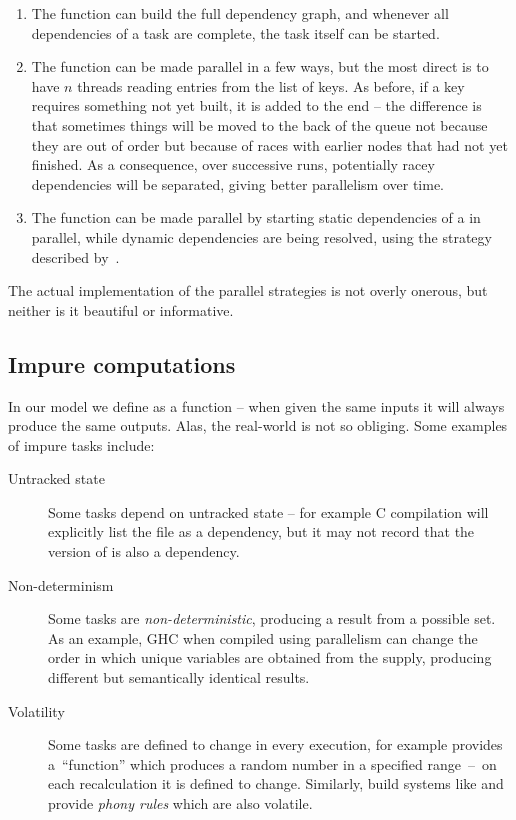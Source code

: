 \begin{enumerate}
\item The  function can build the full dependency graph, and
whenever all dependencies of a task are complete, the task itself can be started.

\item The  function can be made parallel in a few ways, but the
most direct is to have $n$ threads reading entries from the list of keys. As
before, if a key requires something not yet built, it is added to the end -- the
difference is that sometimes things will be moved to the back of the queue not
because they are out of order but because of races with earlier nodes that had
not yet finished. As a consequence, over successive runs, potentially racey
dependencies will be separated, giving better parallelism over time.

\item The  function can be made parallel by starting static
dependencies of a  in parallel, while dynamic dependencies are being
resolved, using the strategy described by~\citet{marlow2014haxl}.
\end{enumerate}

The actual implementation of the parallel strategies is not overly onerous,
but neither is it beautiful or informative.

\subsection{Impure computations}\label{sec-non-determinism}

In our model we define  as a function -- when given the same inputs it
will always produce the same outputs. Alas, the real-world is not so obliging.
Some examples of impure tasks include:

\begin{description}
\item[Untracked state] Some tasks depend on untracked state -- for example
C compilation will explicitly list the  file as a dependency,
but it may not record that the version of  is also a dependency.

\item[Non-determinism] Some tasks are \emph{non-deterministic}, producing a
result from a possible set. As an example, GHC when compiled using parallelism
can change the order in which unique variables are obtained from the supply,
producing different but semantically identical results.

\item[Volatility] Some tasks are defined to change in every execution, for
example \Excel provides a~``function''  which produces a random
number in a specified range~--~on each recalculation it is defined to change.
Similarly, build systems like \Make and \Shake provide \emph{phony rules} which
are also volatile.
\end{description}

